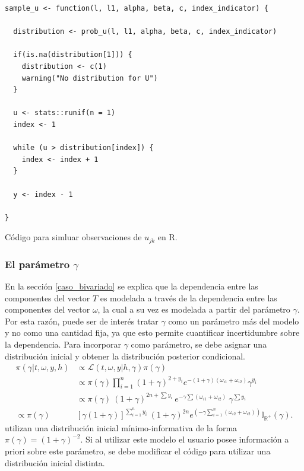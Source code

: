 \documentclass[11pt,a4paper]{article}
\begin{document}
\begin{table}[!htb]
\begin{lstlisting}
sample_u <- function(l, l1, alpha, beta, c, index_indicator) {

  distribution <- prob_u(l, l1, alpha, beta, c, index_indicator)

  if(is.na(distribution[1])) {
    distribution <- c(1)
    warning("No distribution for U")
  }

  u <- stats::runif(n = 1)
  index <- 1

  while (u > distribution[index]) {
    index <- index + 1
  }

  y <- index - 1

}
\end{lstlisting}
\caption{Código para simluar observaciones de $u_{jk}$ en R. }
\label{cod:sim_u}
\end{table}

\clearpage
\newpage

\subsubsection*{El parámetro $\gamma$}

En la sección \ref{caso_bivariado} se explica que la dependencia entre las componentes del vector $T$ es modelada a través de la dependencia entre las componentes del vector $\omega$, la cual a su vez es modelada a partir del parámetro $\gamma$. Por esta razón, puede ser de interés tratar $\gamma$ como un parámetro más del modelo y no como una cantidad fija, ya que esto permite cuantificar incertidumbre sobre la dependencia. Para incorporar $\gamma$ como parámetro, se debe asignar una distribución inicial y obtener la distribución posterior condicional.
\begin{align*}
\pi(\gamma | t, \omega, y, h) &\propto \mathcal{L}(t, \omega, y | h, \gamma) \pi(\gamma)\\
&\propto \pi(\gamma) \prod_{i = 1}^n (1+ \gamma)^{2+y_i} e^{-(1+\gamma)(\omega_{i1} + \omega_{i2})} \gamma^{y_i}\\
&\propto \pi(\gamma) \ (1+\gamma)^{2n+\sum y_i} \ e^{-\gamma\sum(\omega_{i1} + \omega_{i2})} \ \gamma^{\sum y_i}\\
\propto \pi(\gamma) &\left[ \gamma(1+\gamma)\right]^{\sum_{i=1}^n y_i} \ (1+\gamma)^{2n} e^{(-\gamma \sum_{i=1}^n(\omega_{i2} + \omega_{i2}))}\mathbb{I}_{\mathbb{R}^{+}}(\gamma).
\end{align*}
\citet{nieto} utilizan una distribución inicial mínimo-informativa de la forma $\pi(\gamma) = (1+\gamma)^{-2}$. Si al utilizar este modelo el usuario posee información a priori sobre este parámetro, se debe modificar el código para utilizar una distribución inicial distinta.
\end{document}
